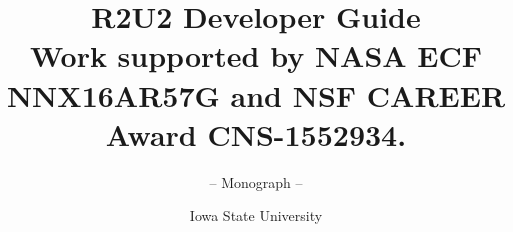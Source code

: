 \documentclass[envcountsame,envcountchap]{tex/svmono}
\begin{document}
\author{Iowa State University}
\title{R2U2 Developer Guide\\
{\small Work supported by NASA ECF NNX16AR57G and NSF CAREER Award CNS-1552934.}}
\subtitle{-- Monograph --}
\maketitle

\frontmatter%


\tableofcontents


\mainmatter%
% 
% 
%

\backmatter%




\printindex

\end{document}
